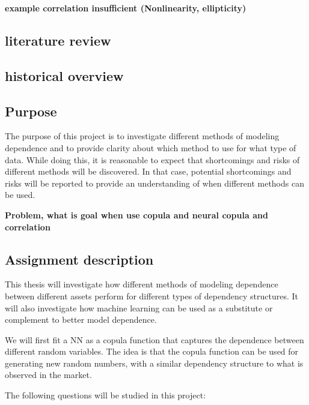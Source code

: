 \textbf{example correlation insufficient (Nonlinearity, ellipticity)}


\subsection{literature review}

\subsection{historical overview }


 
\subsection{Purpose}\label{Purpose}
The purpose of this project is to investigate different methods of modeling dependence and to provide clarity about which method to use for what type of data. While doing this, it is reasonable to expect that shortcomings and risks of different methods will be discovered. In that case, potential shortcomings and risks will be reported to provide an understanding of when different methods can be used. 


\textbf{Problem, what is goal
when use copula and neural copula and correlation}


\subsection{Assignment description}
This thesis will investigate how different methods of modeling dependence between different assets perform for different types of dependency structures. It will also investigate how machine learning can be used as a substitute or complement to better model dependence. 

We will first fit a \gls{NN} as a copula function that captures the dependence between different random variables. The idea is that the copula function can be used for generating new random numbers, with a similar dependency structure to what is observed in the market.   

The following questions will be studied in this project:

